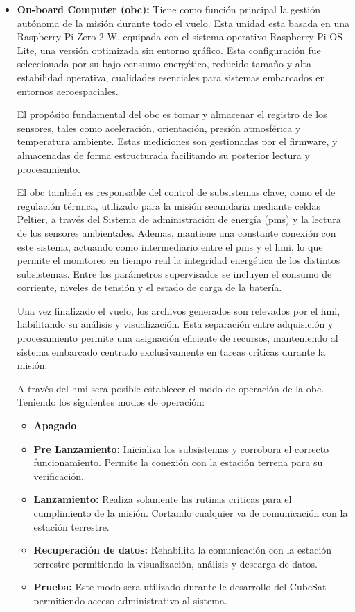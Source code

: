 \begin{itemize}
      \item \textbf{On-board Computer (\acrshort{obc}):} Tiene como función principal la gestión autónoma de
        la misión durante todo el vuelo. Esta unidad esta basada en una Raspberry Pi Zero 2
        W, equipada con el sistema operativo Raspberry Pi OS Lite, una versión optimizada sin
        entorno gráfico. Esta configuración fue seleccionada por su bajo consumo energético,
        reducido tamaño y alta estabilidad operativa, cualidades esenciales para sistemas embarcados
        en entornos aeroespaciales.

        El propósito fundamental del \acrshort{obc} es tomar y almacenar el registro de los sensores,
        tales como aceleración, orientación, presión atmosférica y temperatura ambiente. Estas
        mediciones son gestionadas por el firmware, y almacenadas de forma estructurada
        facilitando su posterior lectura y procesamiento.

        El \acrshort{obc} también es responsable del control de subsistemas clave, como el de regulación
        térmica, utilizado para la misión secundaria mediante celdas Peltier, a través del Sistema de
        administración de energía (\acrshort{pms}) y la lectura de los sensores ambientales. Ademas, mantiene una
        constante conexión con este sistema, actuando como intermediario entre el \acrshort{pms} y el \acrshort{hmi}, lo
        que permite el monitoreo en tiempo real la integridad energética de los distintos subsistemas.
        Entre los parámetros supervisados se incluyen el consumo de corriente, niveles de tensión y el
        estado de carga de la batería.

        Una vez finalizado el vuelo, los archivos generados son relevados por el \acrshort{hmi}, habilitando
        su análisis y visualización. Esta separación entre adquisición y procesamiento permite una asignación
        eficiente de recursos, manteniendo al sistema embarcado centrado
        exclusivamente en tareas criticas durante la misión.

        A través del \acrshort{hmi} sera posible establecer el modo de operación de la \acrshort{obc}. Teniendo los siguientes modos de operación:
        \begin{itemize}
           \item \textbf{Apagado}
           \item \textbf{Pre Lanzamiento:} Inicializa los subsistemas y corrobora el correcto funcionamiento.
            Permite la conexión con la estación terrena para su verificación.
           \item \textbf{Lanzamiento:} Realiza solamente las rutinas criticas para el cumplimiento de la
          misión. Cortando cualquier va de comunicación con la estación terrestre.
           \item \textbf{Recuperación de datos:} Rehabilita la comunicación con la estación terrestre
          permitiendo la visualización, análisis y descarga de datos.
           \item \textbf{Prueba:} Este modo sera utilizado durante le desarrollo del CubeSat permitiendo
          acceso administrativo al sistema.
        \end{itemize}


\end{itemize}
